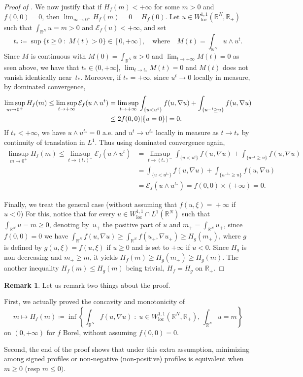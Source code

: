 \documentclass[10pt]{amsart}
\theoremstyle{plain}
\theoremstyle{definition}
\newtheorem{remark}[theorem]{Remark}
\newcommand{\R}{\mathbb{R}}
\newcommand{\ener}{\mathcal{E}}
\newcommand{\loc}{\mathrm{loc}}
\newcommand{\st}{\;:\;}
\DeclarePairedDelimiter{\abs}{\lvert}{\rvert}
\begin{document}
\begin{proof}[Proof of ]
We now justify that if \(H_f(m)<+\infty\) for some \(m>0\) and $f(0,0) = 0$, then \(\lim_{m\to 0^+}H_f(m) = 0 = H_f(0)\). Let \(u\in W^{1,1}_\loc(\R^N,\R_+)\) such that \(\int_{\R^N}u=m>0\) and \(\ener_f(u)<+\infty\), and set
\[
t_\ast\coloneqq\sup\{t\geq 0\st M(t)>0\}\in [0,+\infty], \quad\text{where}\quad M(t)=\int_{\R^N}u\wedge u^t.
\]
Since \(M\) is continuous with \(M(0)=\int_{\R^N}u>0\) and \(\lim_{t\to +\infty}M(t)=0\) as seen above, we have that \(t_\ast\in (0,+\infty]\), \(\lim_{t\to t_\ast}M(t)=0\) and $M(t)$ does not vanish identically near~$t_\ast$. Moreover, if \(t_\ast=+\infty\), since \(u^t\to 0\) locally in measure, by dominated convergence,
\begin{align*}
\limsup_{m\to 0^+}H_f(m)\leq \limsup_{t\to +\infty}\ener_f(u\wedge u^t)
&=\limsup_{t\to +\infty}\int_{\{u<u^t\}}f(u,\nabla u)+\int_{\{u^{-t}\geq u\}}f(u,\nabla u)\\
&\leq 2f(0,0) \abs{\{u=0\}} = 0.
\end{align*}
If \(t_\ast<+\infty\), we have \(u\wedge u^{t_\ast}=0\) a.e. and \(u^t\to u^{t_\ast}\) locally in measure as \(t\to t_\ast\) by continuity of translation in \(L^1\). Thus using dominated convergence again,
\begin{align*}
\limsup_{m\to 0^+}H_f(m)\leq\limsup_{t\to (t_\ast)^-}\ener_f(u\wedge u^t)
&=\limsup_{t\to (t_\ast)^-}\int_{\{u<u^t\}}f(u,\nabla u)+\int_{\{u^{-t}\geq u\}}f(u,\nabla u)\\
&=\int_{\{u< u^{t_\ast}\}}f(u,\nabla u)+\int_{\{u^{-t_\ast}\geq u\}}f(u,\nabla u)\\
&= \ener_f(u\wedge u^{t_\ast}) = f(0,0) \times(+\infty) = 0.
\end{align*}

Finally, we treat the general case (without assuming that $f(u,\xi) \!=\! +\infty$ if \hbox{$u\!<\!0$}) For this, notice that for every $u\in W^{1,1}_\loc\cap L^1(\R^N)$ such that $\int_{\R^N}u=m \geq 0$, denoting by~$u_+$ the positive part of $u$ and $m_+ = \int_{\R^N} u_+$, since $f(0,0) = 0$ we have $\int_{\R^N} f(u,\nabla u) \geq \int_{\R^N} f(u_+,\nabla u_+) \geq H_g(m_+)$, where $g$ is defined by $g(u,\xi) = f(u,\xi)$ if $u\geq 0$ and is set to $+\infty$ if $u<0$. Since $H_g$ is non-decreasing and $m_+ \geq m$, it yields $H_f(m) \geq H_g(m_+) \geq H_g(m)$. The another inequality $H_f(m) \leq H_g(m)$ being trivial, $H_f = H_g$ on $\R_+$.
\end{proof}
\begin{remark}\label{without_f_zero_at_zero}
Let us remark two things about the proof.

First, we actually proved the concavity and monotonicity of
\begin{equation*}
m\mapsto H_f(m) \coloneqq \inf\left\{\int_{\R^N}f(u,\nabla u)\st u\in W^{1,1}_\loc(\R^N,\R_+),\,\int_{\R^N}u=m\right\}
\end{equation*}
on $(0,+\infty)$ for $f$ Borel, without assuming $f(0,0) = 0$.

Second, the end of the proof shows that under this extra assumption, minimizing among signed profiles or non-negative (\resp non-positive) profiles is equivalent when $m \geq 0$ (resp $m \leq 0)$.
\end{remark}
\end{document}
